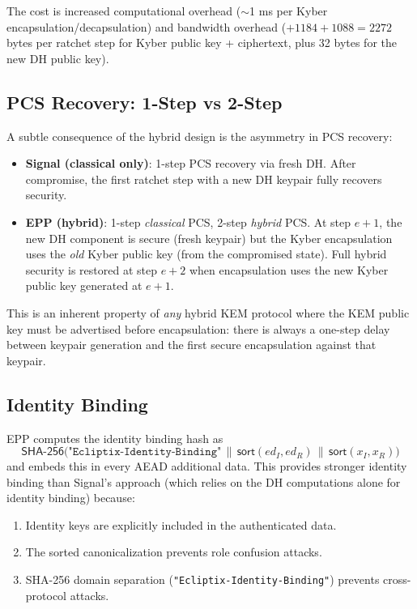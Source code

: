 \documentclass[11pt,a4paper]{article}
\theoremstyle{definition}
\theoremstyle{remark}
\newcommand{\SHA}{\mathsf{SHA\text{-}256}}
\newcommand{\concat}{\,\|\,}
\begin{document}
The cost is increased computational overhead ($\sim$1 ms per Kyber
encapsulation/decapsulation) and bandwidth overhead
($+1184 + 1088 = 2272$ bytes per ratchet step for Kyber public key +
ciphertext, plus 32 bytes for the new DH public key).

\subsection{PCS Recovery: 1-Step vs 2-Step}

A subtle consequence of the hybrid design is the asymmetry in PCS recovery:

\begin{itemize}[nosep]
  \item \textbf{Signal (classical only)}: 1-step PCS recovery via fresh DH.
        After compromise, the first ratchet step with a new DH keypair fully
        recovers security.
  \item \textbf{EPP (hybrid)}: 1-step \emph{classical} PCS, 2-step
        \emph{hybrid} PCS.  At step $e{+}1$, the new DH component is
        secure (fresh keypair) but the Kyber encapsulation uses the
        \emph{old} Kyber public key (from the compromised state).
        Full hybrid security is restored at step $e{+}2$ when
        encapsulation uses the new Kyber public key generated at $e{+}1$.
\end{itemize}

This is an inherent property of \emph{any} hybrid KEM protocol where the
KEM public key must be advertised before encapsulation: there is always a
one-step delay between keypair generation and the first secure
encapsulation against that keypair.

\subsection{Identity Binding}

EPP computes the identity binding hash as
\[
  \SHA\bigl(\texttt{"Ecliptix-Identity-Binding"} \concat
  \mathsf{sort}(\mathit{ed}_{I}, \mathit{ed}_{R}) \concat
  \mathsf{sort}(\mathit{x}_{I}, \mathit{x}_{R})\bigr)
\]
and embeds this in every AEAD additional data.  This provides stronger
identity binding than Signal's approach (which relies on the DH computations
alone for identity binding) because:
\begin{enumerate}[nosep]
  \item Identity keys are explicitly included in the authenticated data.
  \item The sorted canonicalization prevents role confusion attacks.
  \item SHA-256 domain separation (\texttt{"Ecliptix-Identity-Binding"})
        prevents cross-protocol attacks.
\end{enumerate}
\end{document}
